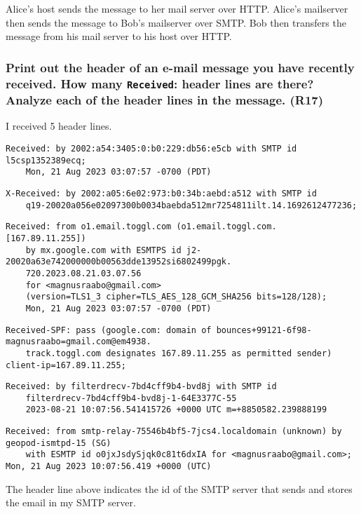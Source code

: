 Alice's host sends the message to her mail server over HTTP. Alice's mailserver then sends the message to Bob's mailserver over SMTP. Bob then transfers the message from his mail server to his host over HTTP. 

\subsubsection{Print out the header of an e-mail message you have recently received. How many \texttt{Received}: header lines are there? Analyze each of the header lines in the message. (R17)}

I received 5 header lines. 
\begin{verbatim}
Received: by 2002:a54:3405:0:b0:229:db56:e5cb with SMTP id l5csp1352389ecq;
    Mon, 21 Aug 2023 03:07:57 -0700 (PDT)
\end{verbatim}
\begin{verbatim}
X-Received: by 2002:a05:6e02:973:b0:34b:aebd:a512 with SMTP id
    q19-20020a056e02097300b0034baebda512mr7254811ilt.14.1692612477236;
\end{verbatim}
\begin{verbatim}
Received: from o1.email.toggl.com (o1.email.toggl.com. [167.89.11.255])
    by mx.google.com with ESMTPS id j2-20020a63e742000000b00563dde13952si6802499pgk.
    720.2023.08.21.03.07.56
    for <magnusraabo@gmail.com>
    (version=TLS1_3 cipher=TLS_AES_128_GCM_SHA256 bits=128/128);
    Mon, 21 Aug 2023 03:07:57 -0700 (PDT)
\end{verbatim}
\begin{verbatim}
Received-SPF: pass (google.com: domain of bounces+99121-6f98-magnusraabo=gmail.com@em4938.
    track.toggl.com designates 167.89.11.255 as permitted sender) client-ip=167.89.11.255;
\end{verbatim}
\begin{verbatim}
Received: by filterdrecv-7bd4cff9b4-bvd8j with SMTP id
    filterdrecv-7bd4cff9b4-bvd8j-1-64E3377C-55
    2023-08-21 10:07:56.541415726 +0000 UTC m=+8850582.239888199
\end{verbatim}
\begin{verbatim}
Received: from smtp-relay-75546b4bf5-7jcs4.localdomain (unknown) by geopod-ismtpd-15 (SG) 
    with ESMTP id o0jxJsdySjqk0c81t6dxIA for <magnusraabo@gmail.com>; Mon, 21 Aug 2023 10:07:56.419 +0000 (UTC)
\end{verbatim}
The header line above indicates the id of the SMTP server that sends and stores the email in my SMTP server.